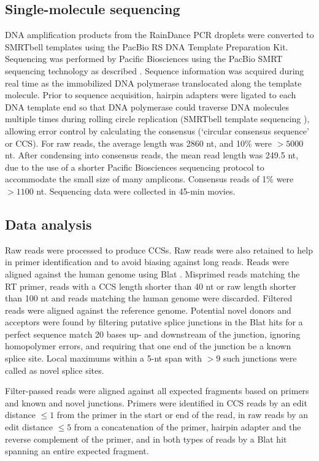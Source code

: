 \documentclass[../sherrill-Mix_thesis.tex]{subfiles}
\begin{document}
\subsection{Single-molecule sequencing}
DNA amplification products from the RainDance PCR droplets were converted to SMRTbell templates using the PacBio RS DNA Template Preparation Kit. Sequencing was performed by Pacific Biosciences using the PacBio SMRT sequencing technology as described \citep{Eid2009}. Sequence information was acquired during real time as the immobilized DNA polymerase translocated along the template molecule. Prior to sequence acquisition, hairpin adapters were ligated to each DNA template end so that DNA polymerase could traverse DNA molecules multiple times during rolling circle replication (SMRTbell template sequencing \citep{Travers2010}), allowing error control by calculating the consensus (`circular consensus sequence' or CCS). For raw reads, the average length was 2860 nt, and 10\% were $>5000$ nt. After condensing into consensus reads, the mean read length was 249.5 nt, due to the use of a shorter Pacific Biosciences sequencing protocol to accommodate the small size of many amplicons. Consensus reads of 1\% were $>1100$ nt. Sequencing data were collected in 45-min movies.

\subsection{Data analysis}
Raw reads were processed to produce CCSs. Raw reads were also retained to help in primer identification and to avoid biasing against long reads. Reads were aligned against the human genome using Blat \citep{Kent2002}. Misprimed reads matching the RT primer, reads with a CCS length shorter than 40 nt or raw length shorter than 100 nt and reads matching the human genome were discarded. Filtered reads were aligned against the \hivEight{} reference genome. Potential novel donors and acceptors were found by filtering putative splice junctions in the Blat hits for a perfect sequence match 20 bases up- and downstream of the junction, ignoring homopolymer errors, and requiring that one end of the junction be a known splice site. Local maximums within a 5-nt span with $>9$ such junctions were called as novel splice sites.

Filter-passed reads were aligned against all expected fragments based on primers and known and novel junctions. Primers were identified in CCS reads by an edit distance $\le 1$ from the primer in the start or end of the read, in raw reads by an edit distance $\le 5$ from a concatenation of the primer, hairpin adapter and the reverse complement of the primer, and in both types of reads by a Blat hit spanning an entire expected fragment.
\end{document}
